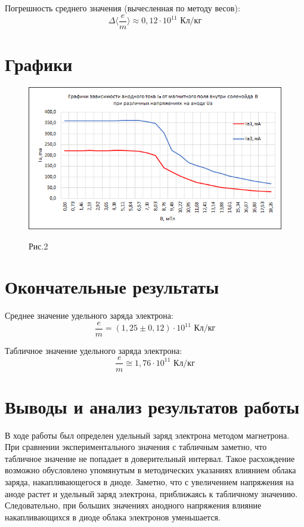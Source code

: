 \documentclass[12pt]{article}
\begin{document}
Погрешность среднего значения (вычесленная по методу весов):
\begin{equation*}
    \Delta \langle \frac{e}{m} \rangle \approx 0,12\cdot10^{11} \textit{ Кл/кг}
\end{equation*}

\newpage
\section{Графики}
\begin{figure}[h!]
    \centering
    \includegraphics[width = 1\textwidth]{3.03.png}
    \begin{flushright}   
    Рис.2
    \end{flushright}
\end{figure}

\section{Окончательные результаты}

Среднее значение удельного заряда электрона:
$$\frac{e}{m} = (1,25\pm0,12)\cdot10^{11} \textit{ Кл/кг} $$

Табличное значение удельного заряда электрона:
$$\frac{e}{m} \cong 1,76\cdot10^{11} \textit{ Кл/кг} $$

\newpage
\section{Выводы и анализ результатов работы}
В ходе работы был определен удельный заряд электрона методом магнетрона. При сравнении экспериментального значения с табличным заметно, что табличное значение не попадает в доверительный интервал. Такое расхождение возможно обусловлено упомянутым в методических указаниях влиянием облака заряда, накапливающегося в диоде. Заметно, что с увеличением напряжения на аноде растет и удельный заряд электрона, приближаясь к  табличному значению. Следовательно, при больших значениях анодного напряжения влияние накапливающихся в диоде облака электронов уменьшается.
\end{document}
